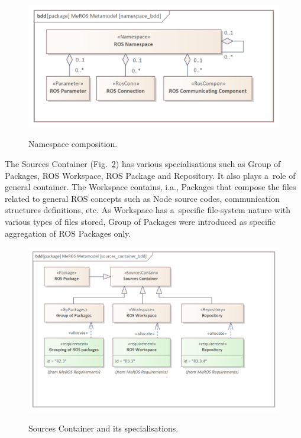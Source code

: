 \documentclass[11pt,oneside,a4paper]{report}
\begin{document}
	
	\begin{figure}[H]
		\centering
		\begin{center}
			{\includegraphics[scale=1.0]{img/meros_pkg/namespace_bdd.png}}
		\end{center}
		\caption{Namespace composition.} 
		\label{fig:namespace_bdd}
	\end{figure}
	
	The Sources Container (Fig.~\ref{fig:sources_container_bdd}) has various specialisations such as Group of Packages, ROS Workspace, ROS Package and Repository. It also plays a~role of general container.  
	The Workspace contains, i.a., Packages that compose the files related to general ROS concepts such as Node source codes, communication structures definitions, etc. As Workspace has a~specific file-system nature with various types of files stored, Group of Packages were introduced as specific aggregation of ROS Packages only.
	
	
	\begin{figure}[H]
		\centering
		\begin{center}
			{\includegraphics[scale=1.0]{img/meros_pkg/sources_container_bdd.png}}
		\end{center}
		\caption{Sources Container and its specialisations.} 
		\label{fig:sources_container_bdd}
	\end{figure}
	
\end{document}
